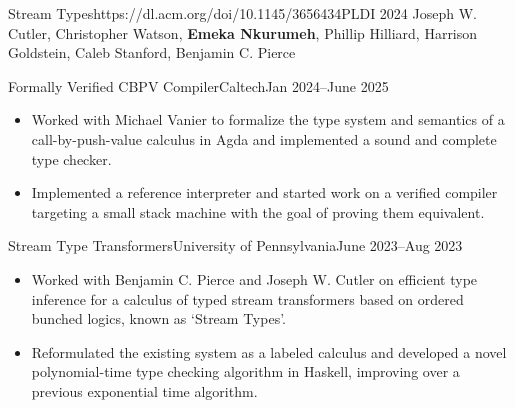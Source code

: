 \documentclass[a4paper,10pt]{article}
\begin{document}



    \begin{publication}{Stream Types}{https://dl.acm.org/doi/10.1145/3656434}{PLDI 2024}
      Joseph W. Cutler, Christopher Watson, \textbf{Emeka Nkurumeh}, Phillip Hilliard, Harrison Goldstein, Caleb Stanford, Benjamin C. Pierce
    \end{publication}

    \begin{activity*}{Formally Verified CBPV Compiler}{Caltech}{Jan 2024--June 2025}
      \begin{itemize}[topsep=4pt, partopsep=0pt, itemsep=-2pt]
        \item Worked with Michael Vanier to formalize the type system and semantics of a call-by-push-value calculus in Agda and implemented a sound and complete type checker.
        \item Implemented a reference interpreter and started work on a verified compiler targeting a small stack machine with the goal of proving them equivalent.
      \end{itemize}
    \end{activity*}

    \begin{activity*}{Stream Type Transformers}{University of Pennsylvania}{June 2023--Aug 2023}
      \begin{itemize}[topsep=4pt, partopsep=0pt, itemsep=-2pt]
        \item Worked with Benjamin C. Pierce and Joseph W. Cutler on efficient type inference for a calculus of typed stream transformers based on ordered bunched logics, known as `Stream Types'.
        \item Reformulated the existing system as a labeled calculus and developed a novel polynomial-time type checking algorithm in Haskell, improving over a previous exponential time algorithm.
      \end{itemize}
    \end{activity*}
\end{document}
